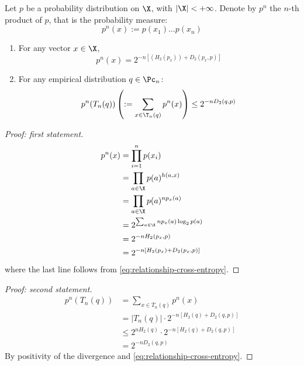 \documentclass[toc, titlepaged]{../cs-classes/cs-classes}
\begin{document}
\begin{lemma}
    Let $p$ be a probability distribution on $\X$, with $|\X|<+\infty$. Denote by $p^n$ the $n$-th product of $p$, that is the probability measure:
    \begin{equation*}
        p^n(x) := p(x_1)\dots p(x_n)
    \end{equation*}
    \begin{enumerate}
        \item For any vector $x\in\X$,
        \begin{equation*}
            p^n(x) = 2^{-n\left[(H_2(p_x))+D_2(p_x, p)\right]}
        \end{equation*}
        \item For any empirical distribution $q\in\Pc_n$:
        \begin{equation*}
            p^n(T_n(q)) \left(:=\sum_{x\in\T_n(q)} p^n(x)\right) \leq 2^{-nD_2(q, p)}
        \end{equation*}
    \end{enumerate}
\end{lemma}
\begin{proof}[Proof: first statement]
    \begin{equation*}
        \begin{aligned}
            p^n(x)&=\prod_{i=1}^n p(x_i)\\
            &= \prod_{a\in\X} p(a)^{h(a, x)}\\
            &= \prod_{a\in\X} p(a)^{np_x(a)}\\
            &= 2^{\sum_{a\in\X}np_x(a)\log_2 p(a)}\\
            &= 2^{-nH_2(p_x, p)}\\
            &= 2^{-n\left[H_2(p_x)+D_2(p_x, p)\right]}
        \end{aligned}
    \end{equation*}
    where the last line follows from \eqref{eq:relationship-cross-entropy}.
\end{proof}
\begin{proof}[Proof: second statement]
    \begin{equation*}
        \begin{aligned}
            p^n(T_n(q))&=\sum_{x\in T_n(q)}p^n(x)\\
            &= |T_n(q)|\cdot 2^{-n\left[H_2(q)+D_2(q, p)\right]}\\
            &\leq 2^{nH_2(q)} \cdot 2^{-n[H_2(q)+D_2(q, p)]}\\
            &= 2^{-nD_2(q, p)}
        \end{aligned}
    \end{equation*}
    By positivity of the divergence and \eqref{eq:relationship-cross-entropy}.
\end{proof}
\end{document}
